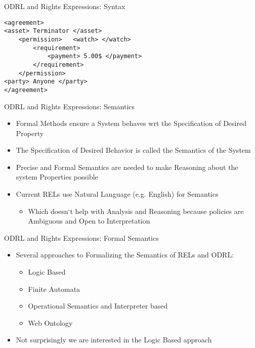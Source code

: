 \documentclass{beamer}
\begin{document}
\begin{frame}[fragile]{ODRL and Rights Expressions: Syntax}
\lstset{language=XML}
\begin{lstlisting}[caption={Syntax of Policies in XML}]
<agreement> 
<asset> Terminator </asset> 
	<permission>   <watch> </watch>  
		<requirement>   
			<payment> 5.00$ </payment>
		</requirement> 
	</permission> 
<party> Anyone </party>
</agreement>
\end{lstlisting}
\end{frame}
\begin{frame}[fragile]{ODRL and Rights Expressions: Semantics}
\Large
\begin{itemize}
\item Formal Methods ensure a System behaves wrt the Specification of Desired Property
\item The Specification of Desired Behavior is called the Semantics of the System
\item Precise and Formal Semantics are needed to make Reasoning about the system Properties possible
\item Current RELs use Natural Language (e.g. English) for Semantics
   \begin{itemize}
    \item Which doesn`t help with Analysis and Reasoning because policies are Ambiguous and Open to Interpretation
    \end{itemize}    
\end{itemize}
\end{frame}
\begin{frame}[fragile]{ODRL and Rights Expressions: Formal Semantics}
\LARGE
\begin{itemize}
\item Several approaches to Formalizing the Semantics of RELs and ODRL:
   \begin{itemize}
      \item Logic Based
      \item Finite Automata
      \item Operational Semantics and Interpreter based
      \item Web Ontology
    \end{itemize}
\item Not surprisingly we are interested in the Logic Based approach
\end{itemize}
\end{frame}
\end{document}
